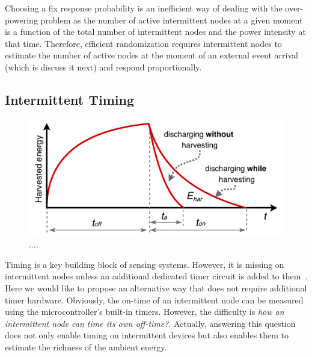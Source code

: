 Choosing a fix response probability is an inefficient way of dealing with the over-powering problem as the number of active intermittent nodes at a given moment is a function of the total number of intermittent nodes and the power intensity at that time. Therefore, efficient randomization requires intermittent nodes to estimate the number of active nodes at the moment of an external event arrival (which is discuss it next) and respond proportionally.


\subsection{Intermittent Timing}
\label{subsec:interTimer}
%
\begin{figure}[t]
		\centering
		\includegraphics[width=\columnwidth]{figures/softwareClock}
		\caption{....}
		\label{fig:softwareClock}
\end{figure} 
%

Timing is a key building block of sensing systems. However, it is missing on intermittent nodes unless an additional dedicated timer circuit is added to them~\cite{hester2017timely}. Here we would like to propose an alternative way that does not require additional timer hardware. Obviously, the on-time of an intermittent node can be measured using the microcontroller's built-in timers. However, the difficulty is \textit{how an intermittent node can time its own off-time?}. Actually, answering this question does not only enable timing on intermittent devices but also enables them to estimate the richness of the ambient energy. 

